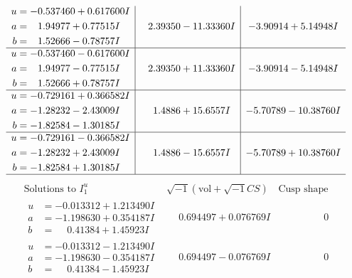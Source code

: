 \documentclass[1p]{elsarticle_modified}
\theoremstyle{definition}
\newcommand{\I}{\sqrt{-1}}
\begin{document}
$$\begin{array}{c|c|c}
\begin{aligned}
u &= -0.537460 + 0.617600 I \\
a &= \phantom{-}1.94977 + 0.77515 I \\
b &= \phantom{-}1.52666 - 0.78757 I\end{aligned}
 & \phantom{-}2.39350 - 11.33360 I & -3.90914 + 5.14948 I \\ \hline\begin{aligned}
u &= -0.537460 - 0.617600 I \\
a &= \phantom{-}1.94977 - 0.77515 I \\
b &= \phantom{-}1.52666 + 0.78757 I\end{aligned}
 & \phantom{-}2.39350 + 11.33360 I & -3.90914 - 5.14948 I \\ \hline\begin{aligned}
u &= -0.729161 + 0.366582 I \\
a &= -1.28232 - 2.43009 I \\
b &= -1.82584 - 1.30185 I\end{aligned}
 & \phantom{-}1.4886 + 15.6557 I & -5.70789 - 10.38760 I \\ \hline\begin{aligned}
u &= -0.729161 - 0.366582 I \\
a &= -1.28232 + 2.43009 I \\
b &= -1.82584 + 1.30185 I\end{aligned}
 & \phantom{-}1.4886 - 15.6557 I & -5.70789 + 10.38760 I\\
 \hline 
 \end{array}$$\newpage$$\begin{array}{c|c|c}  
\text{Solutions to }I^u_{1}& \I (\text{vol} + \sqrt{-1}CS) & \text{Cusp shape}\\
 \hline 
\begin{aligned}
u &= -0.013312 + 1.213490 I \\
a &= -1.198630 + 0.354187 I \\
b &= \phantom{-}0.41384 + 1.45923 I\end{aligned}
 & \phantom{-}0.694497 + 0.076769 I & \phantom{-0.000000 } 0 \\ \hline\begin{aligned}
u &= -0.013312 - 1.213490 I \\
a &= -1.198630 - 0.354187 I \\
b &= \phantom{-}0.41384 - 1.45923 I\end{aligned}
 & \phantom{-}0.694497 - 0.076769 I & \phantom{-0.000000 } 0 \\ \hline\begin{aligned}

\end{aligned}
\end{array}$$
\end{document}
